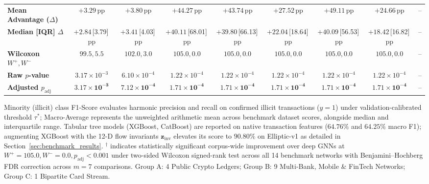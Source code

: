 \begin{table}[t]
{\begin{tabular}{lcccccccc}
\textbf{Mean Advantage ($\Delta$)} & $+3.29$\,pp & $+3.80$\,pp & $+44.27$\,pp & $+43.74$\,pp & $+27.52$\,pp & $+49.11$\,pp & $+24.66$\,pp & -- \\
\textbf{Median [IQR] $\Delta$} & $+2.84$\,[3.79]\,pp & $+3.41$\,[4.03]\,pp & $+40.11$\,[68.01]\,pp & $+39.80$\,[66.13]\,pp & $+22.04$\,[18.64]\,pp & $+40.09$\,[56.53]\,pp & $+18.42$\,[16.82]\,pp & -- \\
\textbf{Wilcoxon $W^+, W^-$} & $99.5, 5.5$ & $102.0, 3.0$ & $105.0, 0.0$ & $105.0, 0.0$ & $105.0, 0.0$ & $105.0, 0.0$ & $105.0, 0.0$ & -- \\
\textbf{Raw $p$-value} & $3.17 \times 10^{-3}$ & $6.10 \times 10^{-4}$ & $1.22 \times 10^{-4}$ & $1.22 \times 10^{-4}$ & $1.22 \times 10^{-4}$ & $1.22 \times 10^{-4}$ & $1.22 \times 10^{-4}$ & -- \\
\textbf{Adjusted $p_{\text{adj}}$} & $\mathbf{3.17 \times 10^{-3}}$ & $\mathbf{7.12 \times 10^{-4}}$ & $\mathbf{1.71 \times 10^{-4}}$ & $\mathbf{1.71 \times 10^{-4}}$ & $\mathbf{1.71 \times 10^{-4}}$ & $\mathbf{1.71 \times 10^{-4}}$ & $\mathbf{1.71 \times 10^{-4}}$ & -- \\
\bottomrule
\end{tabular}%
}
\vspace{0.8ex}

\footnotesize{Minority (illicit) class F1-Score evaluates harmonic precision and recall on confirmed illicit transactions ($y=1$) under validation-calibrated threshold $\tau^*$; Macro-Average represents the unweighted arithmetic mean across benchmark dataset scores, alongside median and interquartile range. Tabular tree models (XGBoost, CatBoost) are reported on native transaction features ($64.76\%$ and $64.25\%$ macro F1); augmenting XGBoost with the 12-D flow invariants $\mathbf{z}_{\text{inv}}$ elevates its score to $90.80\%$ on Elliptic-v1 as detailed in Section~\ref{sec:benchmark_results}. $^\dagger$ indicates statistically significant corpus-wide improvement over deep GNNs at $W^+=105.0, W^-=0.0, p_{\text{adj}} < 0.001$ under two-sided Wilcoxon signed-rank test across all 14 benchmark networks with Benjamini--Hochberg FDR correction across $m=7$ comparisons. Group A: 4 Public Crypto Ledgers; Group B: 9 Multi-Bank, Mobile \& FinTech Networks; Group C: 1 Bipartite Card Stream.}
\end{table}
